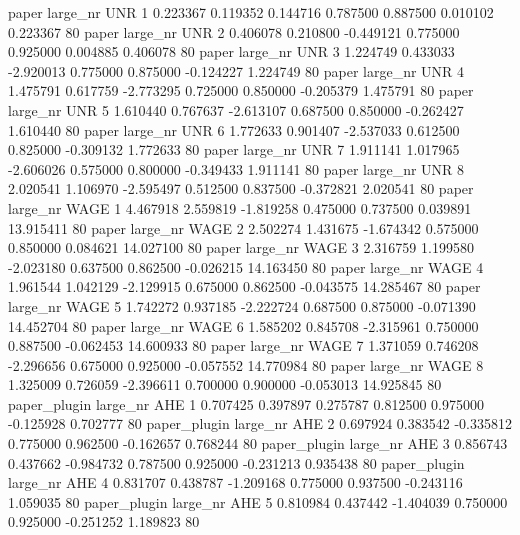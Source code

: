        paper   large_nr      UNR                 1  0.223367  0.119352   0.144716 0.787500 0.887500  0.010102    0.223367 80
       paper   large_nr      UNR                 2  0.406078  0.210800  -0.449121 0.775000 0.925000  0.004885    0.406078 80
       paper   large_nr      UNR                 3  1.224749  0.433033  -2.920013 0.775000 0.875000 -0.124227    1.224749 80
       paper   large_nr      UNR                 4  1.475791  0.617759  -2.773295 0.725000 0.850000 -0.205379    1.475791 80
       paper   large_nr      UNR                 5  1.610440  0.767637  -2.613107 0.687500 0.850000 -0.262427    1.610440 80
       paper   large_nr      UNR                 6  1.772633  0.901407  -2.537033 0.612500 0.825000 -0.309132    1.772633 80
       paper   large_nr      UNR                 7  1.911141  1.017965  -2.606026 0.575000 0.800000 -0.349433    1.911141 80
       paper   large_nr      UNR                 8  2.020541  1.106970  -2.595497 0.512500 0.837500 -0.372821    2.020541 80
       paper   large_nr     WAGE                 1  4.467918  2.559819  -1.819258 0.475000 0.737500  0.039891   13.915411 80
       paper   large_nr     WAGE                 2  2.502274  1.431675  -1.674342 0.575000 0.850000  0.084621   14.027100 80
       paper   large_nr     WAGE                 3  2.316759  1.199580  -2.023180 0.637500 0.862500 -0.026215   14.163450 80
       paper   large_nr     WAGE                 4  1.961544  1.042129  -2.129915 0.675000 0.862500 -0.043575   14.285467 80
       paper   large_nr     WAGE                 5  1.742272  0.937185  -2.222724 0.687500 0.875000 -0.071390   14.452704 80
       paper   large_nr     WAGE                 6  1.585202  0.845708  -2.315961 0.750000 0.887500 -0.062453   14.600933 80
       paper   large_nr     WAGE                 7  1.371059  0.746208  -2.296656 0.675000 0.925000 -0.057552   14.770984 80
       paper   large_nr     WAGE                 8  1.325009  0.726059  -2.396611 0.700000 0.900000 -0.053013   14.925845 80
paper_plugin   large_nr      AHE                 1  0.707425  0.397897   0.275787 0.812500 0.975000 -0.125928    0.702777 80
paper_plugin   large_nr      AHE                 2  0.697924  0.383542  -0.335812 0.775000 0.962500 -0.162657    0.768244 80
paper_plugin   large_nr      AHE                 3  0.856743  0.437662  -0.984732 0.787500 0.925000 -0.231213    0.935438 80
paper_plugin   large_nr      AHE                 4  0.831707  0.438787  -1.209168 0.775000 0.937500 -0.243116    1.059035 80
paper_plugin   large_nr      AHE                 5  0.810984  0.437442  -1.404039 0.750000 0.925000 -0.251252    1.189823 80
